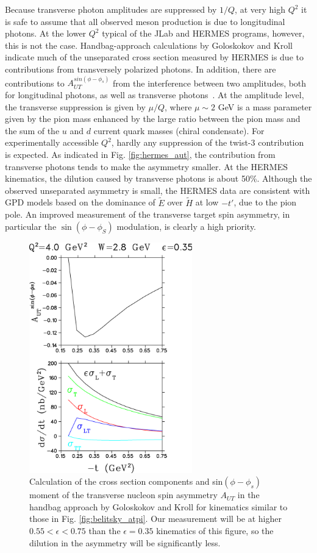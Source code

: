 Because transverse photon amplitudes are suppressed by $1/Q$, at very high
$Q^2$ it is safe to assume that all observed meson production is due to
longitudinal photons.  At the lower $Q^2$ typical of the JLab and HERMES
programs, however, this is not the case.  Handbag-approach
calculations by Goloskokov and Kroll
\cite{Go10} indicate much of the unseparated cross section measured by HERMES
\cite{hermes10} is due to contributions from transversely polarized photons.
In addition, there are contributions to $A_{UT}^{sin(\phi-\phi_s)}$ from the
interference between two amplitudes, both for longitudinal photons, as well as
transverse photons~\cite{Di05}.
At the amplitude level, the transverse suppression is given by $\mu/Q$, where
$\mu\sim 2$ GeV is a mass parameter given by the pion mass enhanced by the
large ratio between the pion mass and the sum of the $u$ and $d$ current quark
masses (chiral condensate).  For experimentally accessible $Q^2$, hardly any
suppression of the twist-3 contribution is expected.  As indicated in
Fig. \ref{fig:hermes_aut}, the contribution from transverse photons tends to
make the asymmetry smaller.  At the HERMES kinematics, the dilution caused by
transverse photons is about 50\%.
Although the observed unseparated asymmetry is small, the HERMES data are
consistent with GPD models based on the dominance of $\tilde{E}$ over
$\tilde{H}$ at low $-t'$, due to the pion pole.  An improved measurement of the
transverse target spin asymmetry, in particular the $\sin(\phi-\phi_S)$
modulation, is clearly a high priority.

\begin{figure}[hbt!]
\begin{center}
\includegraphics[height=10cm]{./figures/goloskokov2.png}
\caption{\label{fig:golo_aut}
\footnotesize{
Calculation of the cross section components and sin$(\phi-\phi_s)$ moment of
the transverse nucleon spin asymmetry $A_{UT}$ in the handbag approach by
Goloskokov and Kroll \cite{GoPC} for kinematics similar to those in
Fig. \ref{fig:belitsky_atpi}.  Our measurement will be at higher
$0.55<\epsilon<0.75$ than the $\epsilon=0.35$ kinematics of this figure,
so the dilution in the asymmetry will be significantly less.}}
\end{center}
\end{figure}

